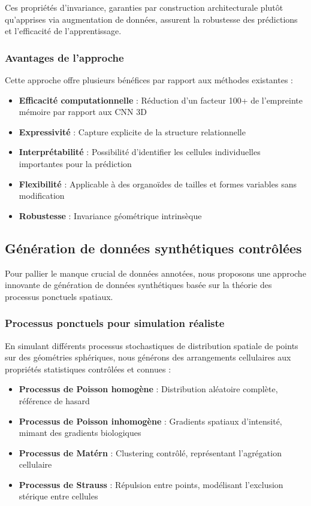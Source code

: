 Ces propriétés d'invariance, garanties par construction architecturale plutôt qu'apprises via augmentation de données, assurent la robustesse des prédictions et l'efficacité de l'apprentissage.

\subsubsection{Avantages de l'approche}

Cette approche offre plusieurs bénéfices par rapport aux méthodes existantes :
\begin{itemize}
    \item \textbf{Efficacité computationnelle} : Réduction d'un facteur 100+ de l'empreinte mémoire par rapport aux CNN 3D
    \item \textbf{Expressivité} : Capture explicite de la structure relationnelle
    \item \textbf{Interprétabilité} : Possibilité d'identifier les cellules individuelles importantes pour la prédiction
    \item \textbf{Flexibilité} : Applicable à des organoïdes de tailles et formes variables sans modification
    \item \textbf{Robustesse} : Invariance géométrique intrinsèque
\end{itemize}

\subsection{Génération de données synthétiques contrôlées}

Pour pallier le manque crucial de données annotées, nous proposons une approche innovante de génération de données synthétiques basée sur la théorie des processus ponctuels spatiaux.

\subsubsection{Processus ponctuels pour simulation réaliste}

En simulant différents processus stochastiques de distribution spatiale de points sur des géométries sphériques, nous générons des arrangements cellulaires aux propriétés statistiques contrôlées et connues :

\begin{itemize}
    \item \textbf{Processus de Poisson homogène} : Distribution aléatoire complète, référence de hasard
    \item \textbf{Processus de Poisson inhomogène} : Gradients spatiaux d'intensité, mimant des gradients biologiques
    \item \textbf{Processus de Matérn} : Clustering contrôlé, représentant l'agrégation cellulaire
    \item \textbf{Processus de Strauss} : Répulsion entre points, modélisant l'exclusion stérique entre cellules
\end{itemize}

